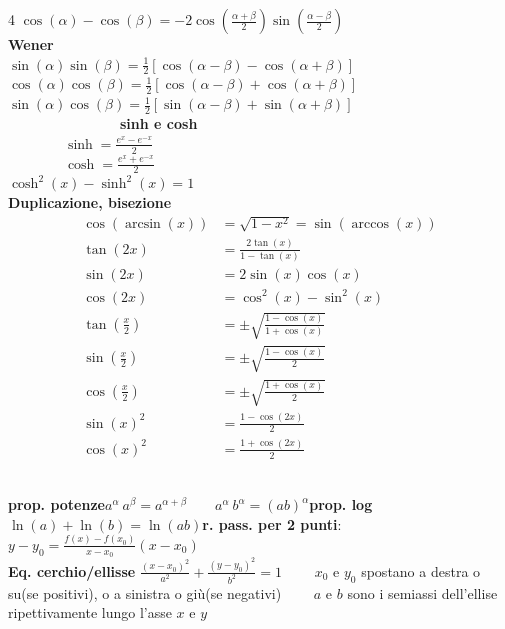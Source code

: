 \documentclass[a4paper, oneside]{article}
\newcommand{\tab}{\hspace*{2em}}
\begin{document}
\begin{multicols}{4}
        $\cos(\alpha) - \cos(\beta) = -2\cos\left(\frac{\alpha + \beta}{2}\right)\sin\left(\frac{\alpha - \beta}{2}\right)$ \\
    \textbf{Wener}\\
        $\sin(\alpha) \sin(\beta) = \frac{1}{2}[\cos(\alpha-\beta) - \cos(\alpha+\beta)]$\\
        $\cos(\alpha) \cos(\beta) = \frac{1}{2}[\cos(\alpha-\beta) + \cos(\alpha+\beta)]$\\
        $\sin(\alpha) \cos(\beta) = \frac{1}{2}[\sin(\alpha-\beta) + \sin(\alpha+\beta)]$\\
    $\qquad\qquad\qquad\qquad$\textbf{sinh e cosh}\\
            $\qquad\qquad\sinh = \frac{e^{x} -e^{-x} }{2}$ \\
            $\qquad\qquad\cosh = \frac{e^{x} +e^{-x} }{2}$ \\
            $\cosh^2(x)-\sinh^2(x) = 1$\\
    \textbf{Duplicazione, bisezione}
    \begin{align*}
        \cos(\arcsin(x)) &= \sqrt{1 - x^2} = \sin(\arccos(x)) \\
        \tan(2x) &= \frac{2\tan(x)}{1-\tan(x)} \\
        \sin(2x) &= 2\sin(x)\cos(x) \\
        \cos(2x) &= \cos^2(x) - \sin^2(x) \\
        \tan\left(\frac{x}{2}\right) &= \pm \sqrt{\frac{1-\cos(x)}{1+\cos(x)}} \\
        \sin\left(\frac{x}{2}\right) &= \pm \sqrt{\frac{1-\cos(x)}{2}} \\
        \cos\left(\frac{x}{2}\right) &= \pm \sqrt{\frac{1+\cos(x)}{2}} \\
        \sin(x)^{2} &= \frac{1 - \cos(2x)}{2} \\
        \cos(x)^{2} &= \frac{1 + \cos(2x)}{2}
    \end{align*}
\end{multicols}
\noindent\\
\textbf{prop. potenze}$a^\alpha \ a^\beta = a^{\alpha + \beta} \qquad a^\alpha \ b^\alpha = (ab)^\alpha$\tab\textbf{prop. log} $\ln(a)+\ln(b) = \ln(ab)$\tab \textbf{r. pass. per 2 punti}: $y - y_0 = \frac{f(x) - f(x_0)}{x - x_0} (x - x_0)$\\
\textbf{Eq. cerchio/ellisse} $\frac{(x-x_0)^2}{a^2}+\frac{(y-y_0)^2}{b^2} = 1\qquad$ $x_0$ e $y_0$ spostano a destra o su(se positivi), o a sinistra o giù(se negativi)$\qquad$ $a$ e $b$ sono i semiassi dell'ellise ripettivamente lungo l'asse $x$ e $y$\\
\end{document}
